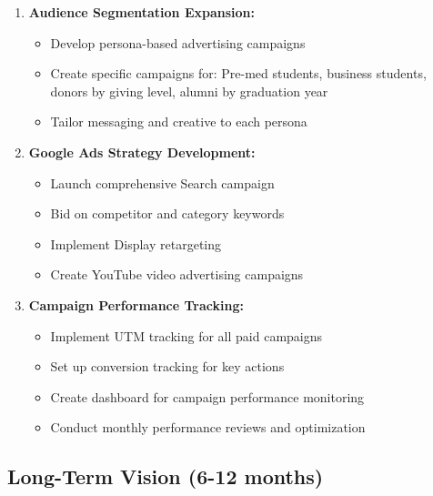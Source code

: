 \documentclass[12pt,letterpaper]{article}
\begin{document}
\begin{enumerate}[leftmargin=*]
    \item \textbf{Audience Segmentation Expansion:}
    \begin{itemize}
        \item Develop persona-based advertising campaigns
        \item Create specific campaigns for: Pre-med students, business students, donors by giving level, alumni by graduation year
        \item Tailor messaging and creative to each persona
    \end{itemize}

    \item \textbf{Google Ads Strategy Development:}
    \begin{itemize}
        \item Launch comprehensive Search campaign
        \item Bid on competitor and category keywords
        \item Implement Display retargeting
        \item Create YouTube video advertising campaigns
    \end{itemize}

    \item \textbf{Campaign Performance Tracking:}
    \begin{itemize}
        \item Implement UTM tracking for all paid campaigns
        \item Set up conversion tracking for key actions
        \item Create dashboard for campaign performance monitoring
        \item Conduct monthly performance reviews and optimization
    \end{itemize}
\end{enumerate}

\subsection{Long-Term Vision (6-12 months)}
\end{document}
